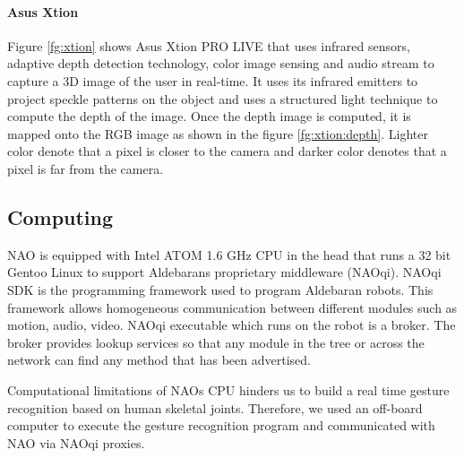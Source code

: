 

\paragraph*{Asus Xtion} Figure \ref{fg:xtion} shows Asus Xtion PRO LIVE that uses infrared sensors, adaptive depth detection technology, color image sensing and audio stream to capture a 3D image of the user in real-time. It uses its infrared emitters to project speckle patterns on the object and uses a structured light technique to compute the depth of the image. Once the depth image is computed, it is mapped onto the RGB image as shown in the figure \ref{fg:xtion:depth}. Lighter color denote that a pixel is closer to the camera and darker color denotes that a pixel is far from the camera.



\subsection{Computing} NAO is equipped with Intel ATOM 1.6 GHz CPU in the head that runs a 32 bit Gentoo Linux to support Aldebarans proprietary middleware (NAOqi). NAOqi SDK is the programming framework used to program Aldebaran robots. This framework allows homogeneous communication between different modules such as motion, audio, video. NAOqi executable which runs on the robot is a broker. The broker provides lookup services so that any module in the tree or across the network can find any method that has been advertised.



Computational limitations of NAOs CPU hinders us to build a real time gesture recognition based on human skeletal joints. Therefore, we used an off-board computer to execute the gesture recognition program and communicated with NAO via NAOqi proxies. 

